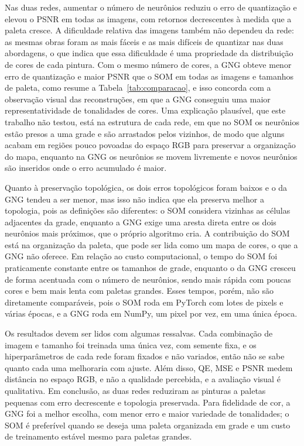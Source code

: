 \documentclass[11pt,a4paper]{article}
\begin{document}
Nas duas redes, aumentar o número de neurônios reduziu o erro de quantização e elevou o PSNR em todas as imagens, com retornos decrescentes à medida que a paleta cresce. A dificuldade relativa das imagens também não dependeu da rede: as mesmas obras foram as mais fáceis e as mais difíceis de quantizar nas duas abordagens, o que indica que essa dificuldade é uma propriedade da distribuição de cores de cada pintura. Com o mesmo número de cores, a GNG obteve menor erro de quantização e maior PSNR que o SOM em todas as imagens e tamanhos de paleta, como resume a Tabela~\ref{tab:comparacao}, e isso concorda com a observação visual das reconstruções, em que a GNG conseguiu uma maior representatividade de tonalidades de cores. Uma explicação plausível, que este trabalho não testou, está na estrutura de cada rede, em que no SOM os neurônios estão presos a uma grade e são arrastados pelos vizinhos, de modo que alguns acabam em regiões pouco povoadas do espaço RGB para preservar a organização do mapa, enquanto na GNG os neurônios se movem livremente e novos neurônios são inseridos onde o erro acumulado é maior.
 
Quanto à preservação topológica, os dois erros topológicos foram baixos e o da GNG tendeu a ser menor, mas isso não indica que ela preserva melhor a topologia, pois as definições são diferentes: o SOM considera vizinhas as células adjacentes da grade, enquanto a GNG exige uma aresta direta entre os dois neurônios mais próximos, que o próprio algoritmo cria. A contribuição do SOM está na organização da paleta, que pode ser lida como um mapa de cores, o que a GNG não oferece. Em relação ao custo computacional, o tempo do SOM foi praticamente constante entre os tamanhos de grade, enquanto o da GNG cresceu de forma acentuada com o número de neurônios, sendo mais rápida com poucas cores e bem mais lenta com paletas grandes. Esses tempos, porém, não são diretamente comparáveis, pois o SOM roda em PyTorch com lotes de pixels e várias épocas, e a GNG roda em NumPy, um pixel por vez, em uma única época.
 
Os resultados devem ser lidos com algumas ressalvas. Cada combinação de imagem e tamanho foi treinada uma única vez, com semente fixa, e os hiperparâmetros de cada rede foram fixados e não variados, então não se sabe quanto cada uma melhoraria com ajuste. Além disso, QE, MSE e PSNR medem distância no espaço RGB, e não a qualidade percebida, e a avaliação visual é qualitativa. Em conclusão, as duas redes reduziram as pinturas a paletas pequenas com erro decrescente e topologia preservada. Para fidelidade de cor, a GNG foi a melhor escolha, com menor erro e maior variedade de tonalidades; o SOM é preferível quando se deseja uma paleta organizada em grade e um custo de treinamento estável mesmo para paletas grandes.
 
\end{document}

